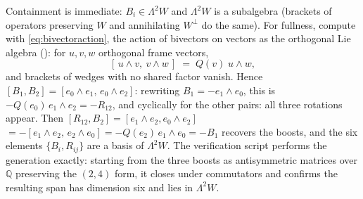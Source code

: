 Containment is immediate: $B_i \in \Lambda^2 W$ and $\Lambda^2 W$ is a subalgebra (brackets of operators preserving $W$ and annihilating $W^\perp$ do the same). For fullness, compute with \eqref{eq:bivectoraction}, the action of bivectors on vectors as the orthogonal Lie algebra (): for $u, v, w$ orthogonal frame vectors,
\[
[\,u\wedge v,\ v\wedge w\,] \;=\; Q(v)\; u\wedge w ,
\]
and brackets of wedges with no shared factor vanish. Hence $[B_1, B_2] = [e_0\wedge e_1,\, e_0 \wedge e_2]$: rewriting $B_1 = -e_1\wedge e_0$, this is $-Q(e_0)\, e_1\wedge e_2 = -R_{12}$, and cyclically for the other pairs: all three rotations appear. Then $[R_{12}, B_2] = [e_1\wedge e_2, e_0\wedge e_2]$ $= -[e_1\wedge e_2,\, e_2\wedge e_0] = -Q(e_2)\,e_1\wedge e_0 = -B_1$ recovers the boosts, and the six elements $\{B_i, R_{ij}\}$ are a basis of $\Lambda^2 W$. The verification script performs the generation exactly: starting from the three boosts as antisymmetric matrices over $\mathbb{Q}$ preserving the $(2,4)$ form, it closes under commutators and confirms the resulting span has dimension six and lies in $\Lambda^2 W$.
